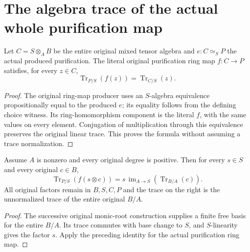 \section{The algebra trace of the actual whole purification map}

\begin{lemma}
\label{lem:kn-nadel-mixed-purification-ring-map-trace}
\leanok
{}
Let $C=S\otimes_A B$ be the entire original mixed tensor algebra and
$e:C\simeq_S P$ the actual produced purification. The literal original
purification ring map $f:C\to P$ satisfies, for every $z\in C$,
\[
 \operatorname{Tr}_{P/S}(f(z))=\operatorname{Tr}_{C/S}(z).
\]
\end{lemma}
\begin{proof}
The original ring-map producer uses an $S$-algebra equivalence
propositionally equal to the produced $e$; its equality follows from
the defining choice witness. Its ring-homomorphism component is the
literal $f$, with the same values on every element. Conjugation of
multiplication through this equivalence preserves the original linear
trace. This proves the formula without assuming a trace normalization.
\end{proof}

\begin{lemma}
\label{lem:kn-nadel-mixed-purification-ring-map-trace-tensor}
\leanok
{}
Assume $A$ is nonzero and every original degree is positive. Then for
every $s\in S$ and every original $c\in B$,
\[
 \operatorname{Tr}_{P/S}(f(s\otimes c))
   =s\,\operatorname{im}_{A\to S}(\operatorname{Tr}_{B/A}(c)).
\]
All original factors remain in $B,S,C,P$ and the trace on the right is
the unnormalized trace of the entire original $B/A$.
\end{lemma}
\begin{proof}
The successive original monic-root construction supplies a finite free
basis for the entire $B/A$. Its trace commutes with base change to
$S$, and $S$-linearity gives the factor $s$. Apply the preceding
identity for the actual purification ring map.
\end{proof}
